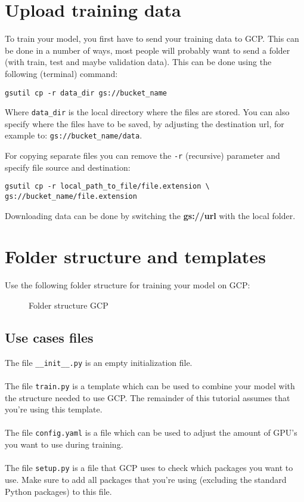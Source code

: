 \documentclass{article}
\begin{document}
\section{Upload training data}
To train your model, you first have to send your training data to GCP. This can be done in a number of ways, most people will probably want to send a folder (with train, test and maybe validation data). This can be done using the following (terminal) command:

\begin{verbatim}
gsutil cp -r data_dir gs://bucket_name
\end{verbatim}

Where \texttt{data\_dir} is the local directory where the files are stored. You can also specify where the files have to be saved, by adjusting the destination url, for example to: \texttt{gs://bucket\_name/data}.

For copying separate files you can remove the \texttt{-r} (recursive) parameter and specify file source and destination:
\begin{verbatim}
gsutil cp -r local_path_to_file/file.extension \
gs://bucket_name/file.extension
\end{verbatim}

Downloading data can be done by switching the \textbf{gs://url} with the local folder.

\section{Folder structure and templates}
Use the following folder structure for training your model on GCP:
\begin{figure}[H]
\caption{Folder structure GCP}
\label{fig:fsgcp}
\end{figure}
\subsection{Use cases files}
The file \texttt{\_\_init\_\_.py} is an empty initialization file.
\\
\\
The file \texttt{train.py} is a template which can be used to combine your model with the structure needed to use GCP. The remainder of this tutorial assumes that you're using this template.
\\
\\
The file \texttt{config.yaml} is a file which can be used to adjust the amount of GPU's you want to use during training. 
\\
\\
The file \texttt{setup.py} is a file that GCP uses to check which packages you want to use. Make sure to add all packages that you're using (excluding the standard Python packages) to this file.
\end{document}
